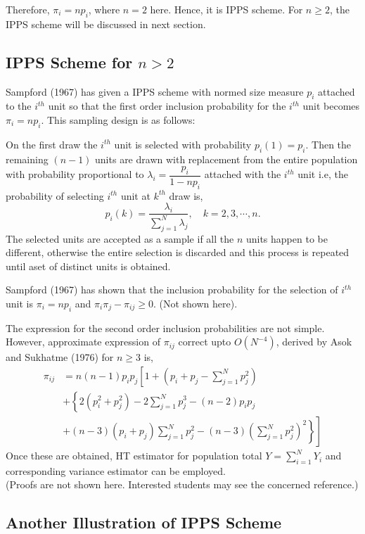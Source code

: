\documentclass[12pt]{article}
\theoremstyle{definition}
\begin{document}
Therefore, $\pi_i = np_i$, where $n = 2$ here. Hence, it is IPPS scheme. For $n \geq 2$, the IPPS scheme will be discussed in next section.

\subsection{IPPS Scheme for $n>2$}
Sampford (1967) has given a IPPS scheme with normed size measure $p_i$ attached to the $i^{th}$ unit so that the first order inclusion probability for the $i^{th}$ unit becomes $\pi_i = np_i$. This sampling design is as follows:

On the first draw the $i^{th}$ unit is selected with probability $p_i(1)=p_i$. Then the remaining $(n-1)$ units are drawn with replacement from the entire population with probability proportional to $\lambda_i = \dfrac{p_i}{1-np_i}$ attached with the $i^{th}$ unit i.e, the probability of selecting $i^{th}$ unit at $k^{th}$ draw is,
$$p_i(k)=\dfrac{\lambda_i}{\displaystyle \sum_{j=1}^N \lambda_j}, \quad k=2,3,\cdots,n.$$
The selected units are accepted as a sample if all the $n$ units happen to be different, otherwise the entire selection is discarded and this process is repeated until aset of distinct units is obtained.


Sampford (1967) has shown that the inclusion probability for the selection of $i^{th}$ unit is $\pi_i=np_i$ and $\pi_i\pi_j-\pi_{ij}\geq 0$. (Not shown here).

The expression for the second order inclusion probabilities are not simple. However, approximate expression of $\pi_{ij}$ correct upto $O(N^{-4})$, derived by Asok and Sukhatme (1976) for $n\geq 3$ is,
\begin{align*}
    \pi_{ij} & =n(n-1)p_ip_j\left[1+\left(p_i+p_j-\sum_{j=1}^N p_j^2\right) \right. \\
    & + \left\{2(p_i^2+p_j^2)-2\sum_{j=1}^N p_j^3 - (n-2)p_i p_j \right. \\ 
    & \left. \left.  +(n-3)(p_i+p_j)\sum_{j=1}^N p_j^2-(n-3)\left(\sum_{j=1}^N p_j^2\right)^2 \right\}
    \right]
\end{align*}
Once these are obtained, HT estimator for population total $Y=\sum_{i=1}^N Y_i$ and corresponding variance estimator can be employed.\\
(Proofs are not shown here. Interested students may see the concerned reference.)

\subsection{Another Illustration of IPPS Scheme}
\end{document}
